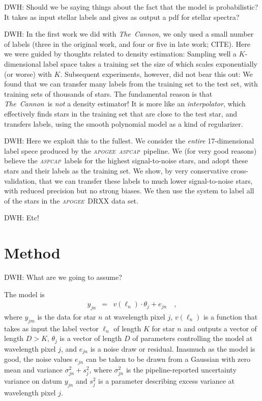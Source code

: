 \documentclass[12pt,preprint]{aastex}
\newcommand{\project}[1]{\textsl{#1}}
\newcommand{\thecannon}{\project{The~Cannon}}
\newcommand{\apogee}{\project{\textsc{apogee}}}
\newcommand{\aspcap}{\project{\textsc{aspcap}}}
\begin{document}
DWH: Should we be saying things about the fact that the model is probabilistic?
It takes as input stellar labels and gives as output a pdf for stellar spectra?

DWH: In the first work we did with \thecannon, we only used a small
number of labels (three in the original work, and four or five in late
work; CITE).
Here we were guided by thoughts related to density estimation:
Sampling well a $K$-dimensional label space takes a training set the
size of which scales exponentially (or worse) with $K$.
Subsequent experiments, however, did not bear this out:
We found that we can transfer many labels from the training set to
the test set, with training sets of thousands of stars.
The fundamental reason is that \thecannon\ is \emph{not} a density estimator!
It is more like an \emph{interpolator}, which effectively finds stars in
the training set that are close to the test star, and transfers labels,
using the smooth polynomial model as a kind of regularizer.

DWH: Here we exploit this to the fullest.
We consider the \emph{entire} 17-dimensional label spece produced by
the \apogee\ \aspcap\ pipeline.
We (for very good reasons) believe the \aspcap\ labels for the highest
signal-to-noise stars, and adopt these stars and their labels as the
training set.
We show, by very conservative cross-validation, that we can transfer these
labels to much lower signal-to-noise stars, with reduced precision but no
strong biases.
We then use the system to label all of the stars in the \apogee\ DRXX data set.

DWH: Etc!

\section{Method}

DWH: What are we going to assume?

The model is
\begin{eqnarray}
  y_{jn} &=& v(\ell_n)\cdot\theta_j + e_{jn}
  \label{eq:model}\quad ,
\end{eqnarray}
where $y_{jm}$ is the data for star $n$ at wavelength pixel $j$,
$v(\ell_n)$ is a function that takes as input
the label vector $\ell_n$ of length $K$ for star $n$
and outputs a vector of length $D>K$,
$\theta_j$ is a vector of length $D$ of parameters controlling the model at wavelength pixel $j$,
and $e_{jn}$ is a noise draw or residual.
Inasmuch as the model is good, the noise values $e_{jn}$ can be taken to be
drawn from a Gaussian with zero mean and variance $\sigma^2_{jn}+s^2_j$,
where $\sigma^2_{jn}$ is the pipeline-reported uncertainty variance on datum
$y_{jn}$ and $s^2_j$ is a parameter describing excess variance at wavelength pixel $j$.
\end{document}
